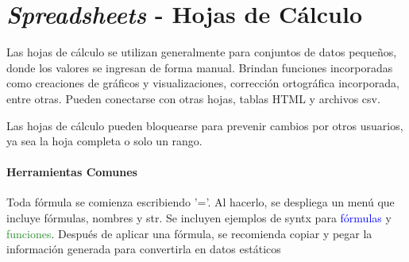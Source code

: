 
\section{\textit{Spreadsheets} - Hojas de Cálculo}
Las hojas de cálculo se utilizan generalmente para conjuntos de datos pequeños, donde los valores se ingresan de forma manual. Brindan funciones incorporadas como creaciones de gráficos y visualizaciones, corrección ortográfica incorporada, entre otras. Pueden conectarse con otras hojas, tablas HTML y archivos \gls{csv}.

Las hojas de cálculo pueden bloquearse para prevenir cambios por otros usuarios, ya sea la hoja completa o solo un rango. 

\paragraph{Herramientas Comunes}
Toda fórmula se comienza escribiendo '='. Al hacerlo, se despliega un menú que incluye fórmulas, nombres y \gls{str}. Se incluyen ejemplos de \gls{syntx} para \textcolor{blue}{fórmulas} y \textcolor{ForestGreen}{funciones}. Después de aplicar una fórmula, se recomienda copiar y pegar la información generada para convertirla en datos estáticos
